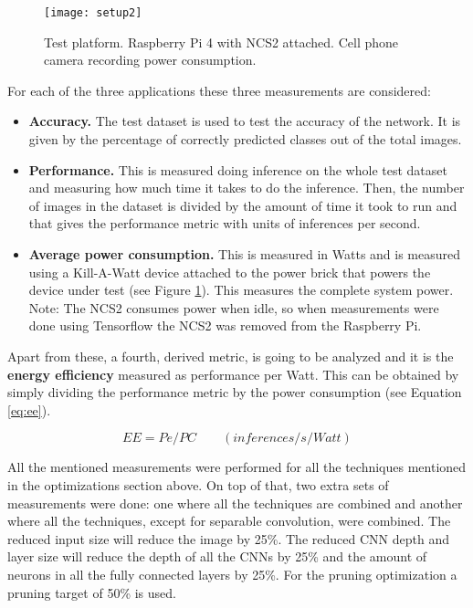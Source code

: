 \begin{figure}[thbp]
	\centering
	\texttt{[image: setup2]}
	\caption{Test platform. Raspberry Pi 4 with NCS2 attached. Cell phone camera recording power consumption.}
	\label{fig:setup2}
\end{figure}

For each of the three applications these three measurements are considered:

\begin{itemize}
    \item \textbf{Accuracy.} The test dataset is used to test the accuracy of the network. It is given by the percentage of correctly predicted classes out of the total images.
    \item \textbf{Performance.} This is measured doing inference on the whole test dataset and measuring how much time it takes to do the inference. Then, the number of images in the dataset is divided by the amount of time it took to run and that gives the performance metric with units of inferences per second.
    \item \textbf{Average power consumption.} This is measured in Watts and is measured using a Kill-A-Watt device attached to the power brick that powers the device under test (see Figure \ref{fig:setup2}). This measures the complete system power. Note: The NCS2 consumes power when idle, so when measurements were done using Tensorflow the NCS2 was removed from the Raspberry Pi.
\end{itemize}

Apart from these, a fourth, derived metric, is going to be analyzed and it is the \textbf{energy efficiency} measured as performance per Watt. This can be obtained by simply dividing the performance metric by the power consumption (see Equation \ref{eq:ee}).

\begin{equation}\label{eq:ee}
EE = Pe / PC
\qquad (inferences/s/Watt)
\end{equation}

All the mentioned measurements were performed for all the techniques mentioned in the optimizations section above. On top of that, two extra sets of measurements were done: one where all the techniques are combined and another where all the techniques, except for separable convolution, were combined. The reduced input size will reduce the image by 25\%. The reduced CNN depth and layer size will reduce the depth of all the CNNs by 25\% and the amount of neurons in all the fully connected layers by 25\%. For the pruning optimization a pruning target of 50\% is used.

